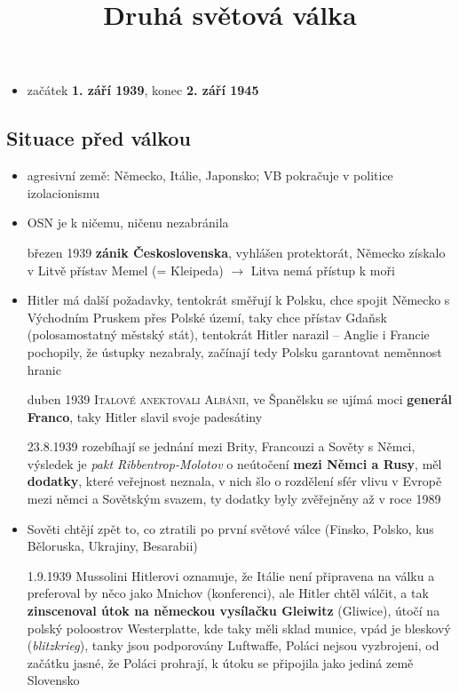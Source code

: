 \documentclass{article}
\title{\vspace{-2cm}Druhá světová válka\vspace{-1.7cm}}
\date{}
\author{}
\begin{document}
\maketitle

\begin{itemize}
    \item začátek \textbf{1. září 1939}, konec \textbf{2. září 1945}
\end{itemize}

\subsection*{Situace před válkou}
\begin{itemize}
    \item agresivní země: Německo, Itálie, Japonsko; VB pokračuje v politice izolacionismu
    \item OSN je k ničemu, ničenu nezabránila
    \item[březen 1939] \textbf{zánik Československa}, vyhlášen protektorát, Německo získalo v Litvě přístav Memel (= Kleipeda) $\rightarrow$ Litva nemá přístup k moři
    \item Hitler má další požadavky, tentokrát směřují k Polsku, chce spojit Německo s Východním Pruskem přes Polské území, taky chce přístav Gdaňsk (polosamostatný městský stát), tentokrát Hitler narazil -- Anglie i Francie pochopily, že ústupky nezabraly, začínají tedy Polsku garantovat neměnnost hranic
    \item[duben 1939] \textsc{Italové anektovali Albánii}, ve Španělsku se ujímá moci \textbf{generál Franco}, taky Hitler slavil svoje padesátiny
    \item[23.8.1939] rozebíhají se jednání mezi Brity, Francouzi a Sověty s Němci, výsledek je \textit{pakt Ribbentrop-Molotov} o neútočení \textbf{mezi Němci a Rusy}, měl \textbf{dodatky}, které veřejnost neznala, v nich šlo o rozdělení sfér vlivu v Evropě mezi němci a Sovětským svazem, ty dodatky byly zvěřejněny až v roce 1989
    \item Sověti chtějí zpět to, co ztratili po první světové válce (Finsko, Polsko, kus Běloruska, Ukrajiny, Besarabii)
    \item[1.9.1939] Mussolini Hitlerovi oznamuje, že Itálie není připravena na válku a preferoval by něco jako Mnichov (konferenci), ale Hitler chtěl válčit, a tak \textbf{zinscenoval útok na německou vysílačku Gleiwitz} (Gliwice), útočí na polský poloostrov Westerplatte, kde taky měli sklad munice, vpád je bleskový (\textit{blitzkrieg}), tanky jsou podporovány Luftwaffe, Poláci nejsou vyzbrojeni, od začátku jasné, že Poláci prohrají, k útoku se připojila jako jediná země Slovensko

\end{itemize}
\end{document}
